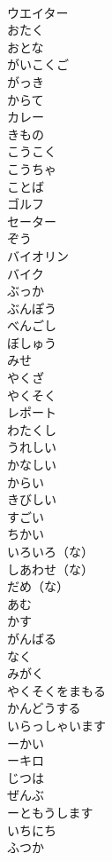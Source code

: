 \documentclass[8pt]{extreport}
\begin{document}
\begin{CJK}{UTF8}{min}
\\	ウエイター	
\\	おたく	
\\	おとな	
\\	がいこくご	
\\	がっき	
\\	からて	
\\	カレー	
\\	きもの	
\\	こうこく	
\\	こうちゃ	
\\	ことば	
\\	ゴルフ	
\\	セーター	
\\	ぞう	
\\	バイオリン	
\\	バイク	
\\	ぶっか	
\\	ぶんぽう	
\\	べんごし	
\\	ぼしゅう	
\\	みせ	
\\	やくざ	
\\	やくそく	
\\	レポート	
\\	わたくし	
\\	うれしい	
\\	かなしい	
\\	からい	
\\	きびしい	
\\	すごい	
\\	ちかい	
\\	いろいろ（な）	
\\	しあわせ（な）	
\\	だめ（な）	
\\	あむ	
\\	かす	
\\	がんばる	
\\	なく	
\\	みがく	
\\	やくそくをまもる	
\\	かんどうする	
\\	いらっしゃいます	
\\	ーかい	
\\	ーキロ	
\\	じつは	
\\	ぜんぶ	
\\	ーともうします	
\\	いちにち	
\\	ふつか	

\end{CJK}
\end{document}
